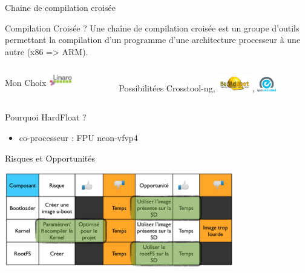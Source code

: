 \documentclass[11pt]{beamer}
\begin{document}
	
	\begin{frame}{Chaine de compilation croisée}
	\begin{block}{ Compilation Croisée ?}
	\centering Une chaîne de compilation croisée est un groupe d'outils permettant la compilation d'un programme d'une architecture processeur à une autre (x86 => ARM).
	\end{block}
	\pause
	\begin{columns}[b]
	\begin{column}{2cm}
	\begin{alertblock}{Mon Choix}
	\centering \includegraphics[width=1cm]{common/linaro.jpeg} %
	\end{alertblock}
	\end{column}

	\begin{column}{8cm}
	\pause
	\begin{block}{Possibilitées}
	\centering Crosstool-ng, \includegraphics[width=1.5cm]{common/buildroot.png}, \includegraphics[width=0.8cm]{common/oe.png}
	\end{block}
	\end{column}
	\end{columns}
	\pause
	\begin{block}{Pourquoi HardFloat ?}
	\begin{itemize}
	 \item co-processeur : FPU neon-vfvp4
	\end{itemize}
	\end{block}

	\end{frame}
	
	\begin{frame}{Risques et Opportunités}
	\begin{center}
	  \includegraphics[width=10cm]{common/risques.png}\\
	\end{center}
	\end{frame}
	
\end{document}
